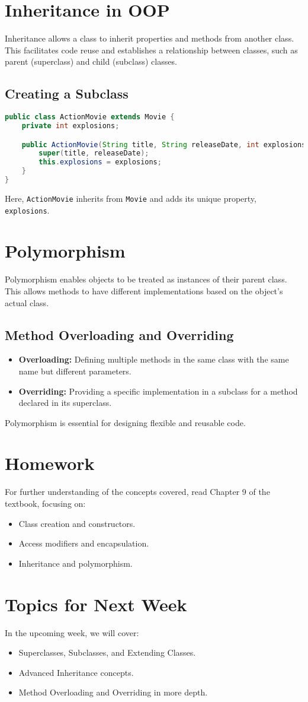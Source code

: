 \documentclass{article}
\begin{document}
\section{Inheritance in OOP}
Inheritance allows a class to inherit properties and methods from another class. This facilitates code reuse and establishes a relationship between classes, such as parent (superclass) and child (subclass) classes.

\subsection{Creating a Subclass}
\begin{lstlisting}[language=Java]
public class ActionMovie extends Movie {
    private int explosions;

    public ActionMovie(String title, String releaseDate, int explosions) {
        super(title, releaseDate);
        this.explosions = explosions;
    }
}
\end{lstlisting}
Here, \texttt{ActionMovie} inherits from \texttt{Movie} and adds its unique property, \texttt{explosions}.

\section{Polymorphism}
Polymorphism enables objects to be treated as instances of their parent class. This allows methods to have different implementations based on the object’s actual class.

\subsection{Method Overloading and Overriding}
\begin{itemize}
    \item \textbf{Overloading:} Defining multiple methods in the same class with the same name but different parameters.
    \item \textbf{Overriding:} Providing a specific implementation in a subclass for a method declared in its superclass.
\end{itemize}
Polymorphism is essential for designing flexible and reusable code.

\section{Homework}
For further understanding of the concepts covered, read Chapter 9 of the textbook, focusing on:
\begin{itemize}
    \item Class creation and constructors.
    \item Access modifiers and encapsulation.
    \item Inheritance and polymorphism.
\end{itemize}

\section{Topics for Next Week}
In the upcoming week, we will cover:
\begin{itemize}
    \item Superclasses, Subclasses, and Extending Classes.
    \item Advanced Inheritance concepts.
    \item Method Overloading and Overriding in more depth.
\end{itemize}
\end{document}
